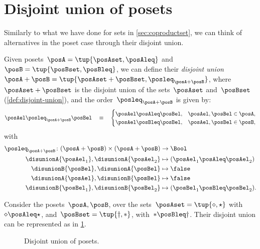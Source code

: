 
\section{Disjoint union of posets}
Similarly to what we have done for sets in \cref{sec:coproductset}, we can think of alternatives in the poset case through their disjoint union.

\begin{definition}
    Given posets~$\posA=\tup{\posAset, \posAleq}$ and~$\posB=\tup{\posBset, \posBleq}$, we can define their \emph{disjoint union}~$\posA+\posB=\tup{\posAset + \posBset, \posleq_{\posA + \posB}}$, where~$\posAset + \posBset$ is the disjoint union of the sets~$\posAset$ and~$\posBset$ (\cref{def:disjoint-union}), and the order~$\posleq_{\posA + \posB}$ is given by:
    \begin{equation}
        \posAel \posleq_{\posA + \posB} \posBel \quad\equiv\quad
        \begin{cases}
            \posAel \posAleq \posBel, & \posAel,\posBel \in \posA, \\
            \posAel \posBleq \posBel, & \posAel,\posBel \in \posB, 
        \end{cases}
    \end{equation}
    with
    \begin{equation}
        \begin{aligned}
            \posleq_{\posA+\posB}\colon (\posA+\posB)\times (\posA+\posB) & \to \Bool                              \\
            \disunionA{\posAel_1},\disunionA{\posAel_2}                   & \mapsto (\posAel_1\posAleq \posAel_2)  \\
            \disunionB{\posBel},\disunionA{\posBel}                       & \mapsto \false                         \\
            \disunionA{\posAel},\disunionB{\posBel}                       & \mapsto \false                         \\
            \disunionB{\posBel_1},\disunionB{\posBel_2}                   & \mapsto (\posBel_1\posBleq \posBel_2). 
        \end{aligned}
    \end{equation}
\end{definition}

\begin{example}
    Consider the posets~$\posA,\posB$, over the sets~$\posAset=\tup{\diamond, \star}$ with~$\diamond \posAleq \star$, and~$\posBset=\tup{\dagger,\ast}$, with~$\ast \posBleq \dagger$.
    Their disjoint union can be represented as in \cref{fig:poset-coproduct}.

    \begin{figure}[h!]
        \centering
        \caption{Disjoint union of posets.}
        \label{fig:poset-coproduct}
    \end{figure}
\end{example}
